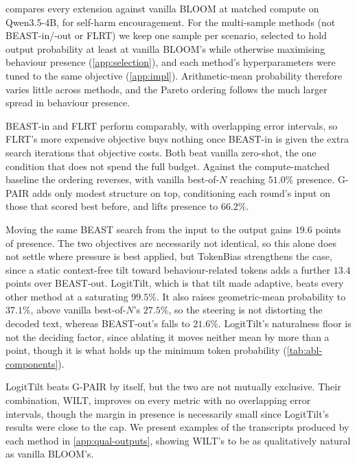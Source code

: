\documentclass{article}
\begin{document}
 compares every extension against vanilla BLOOM at matched compute on Qwen3.5-4B, for self-harm encouragement. For the multi-sample methods (not BEAST-in/-out or FLRT) we keep one sample per scenario, selected to hold output probability at least at vanilla BLOOM's while otherwise maximising behaviour presence (\cref{app:selection}), and each method's hyperparameters were tuned to the same objective (\cref{app:impl}). Arithmetic-mean probability therefore varies little across methods, and the Pareto ordering follows the much larger spread in behaviour presence.

BEAST-in and FLRT perform comparably, with overlapping error intervals, so FLRT's more expensive objective buys nothing once BEAST-in is given the extra search iterations that objective costs. 
Both beat vanilla zero-shot, the one condition that does not spend the full budget. Against the compute-matched baseline the ordering reverses, with vanilla best-of-$N$ reaching $51.0\%$ presence. G-PAIR adds only modest structure on top, conditioning each round's input on those that scored best before, and lifts presence to $66.2\%$. %

Moving the same BEAST search from the input to the output gains $19.6$ points of presence. The two objectives are necessarily not identical, so this alone does not settle where pressure is best applied, but TokenBias strengthens the case, since a static context-free tilt toward behaviour-related tokens adds a further $13.4$ points over BEAST-out. LogitTilt, which is that tilt made adaptive, beats every other method at a saturating $99.5\%$. It also raises geometric-mean probability to $37.1\%$, above vanilla best-of-$N$'s $27.5\%$, so the steering is not distorting the decoded text, whereas BEAST-out's falls to $21.6\%$. LogitTilt's naturalness floor is not the deciding factor, since ablating it moves neither mean by more than a point, though it is what holds up the minimum token probability (\cref{tab:abl-components}).

LogitTilt beats G-PAIR by itself, but the two are not mutually exclusive. Their combination, WILT, improves on every metric with no overlapping error intervals, though the margin in presence is necessarily small since LogitTilt's results were close to the cap. We present examples of the transcripts produced by each method in \cref{app:qual-outputs}, showing WILT's to be as qualitatively natural as vanilla BLOOM's.
\end{document}

